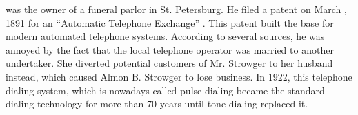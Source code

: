 \documentclass[10pt,journal,compsoc]{IEEEtran}
\begin{document}
%
\IEEEpeerreviewmaketitle







% 
% 
% 
% 
 was the owner of a funeral parlor in St. Petersburg. He filed a patent on March , 1891 for an ``Automatic Telephone Exchange'' \cite{pulseDialingPatent}. This patent built the base for modern automated telephone systems. According to several sources, he was annoyed by the fact that the local telephone operator was married to another undertaker. She diverted potential customers of Mr. Strowger to her husband instead, which caused Almon B. Strowger to lose business. In 1922, this telephone dialing system, which is nowadays called pulse dialing became the standard dialing technology for more than 70 years until tone dialing replaced it.
\end{document}
